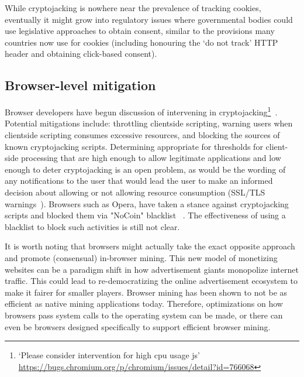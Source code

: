 While cryptojacking is nowhere near the prevalence of tracking cookies, eventually it might grow into regulatory issues where governmental bodies could use legislative approaches to obtain consent, similar to the provisions many countries now use for cookies (including honouring the `do not track' HTTP header and obtaining click-based consent).


\subsection{Browser-level mitigation}

Browser developers have begun discussion of intervening in cryptojacking\footnote{`Please consider intervention for high cpu usage js' \url{https://bugs.chromium.org/p/chromium/issues/detail?id=766068}}~\cite{operanocoin}. Potential mitigations include: throttling clientside scripting, warning users when clientside scripting consumes excessive resources, and blocking the sources of known cryptojacking scripts. Determining appropriate for thresholds for client-side processing that are high enough to allow legitimate applications and low enough to deter cryptojacking is an open problem, as would be the wording of any notifications to the user that would lead the user to make an informed decision about allowing or not allowing resource consumption (\cf SSL/TLS warnings~\cite{SEAAC09,SHB11,Acer:2017:WWR:3133956.3134007}).
Browsers such as Opera, have taken a stance against cryptojacking scripts and blocked them via "NoCoin" blacklist ~\cite{operanocoin}. The effectiveness of using a blacklist to block such activities is still not clear. %

It is worth noting that browsers might actually take the exact opposite approach and promote (consensual) in-browser mining. This new model of monetizing websites can be a paradigm shift in how advertisement giants monopolize internet traffic. This could lead to re-democratizing the online advertisement ecosystem to make it fairer for smaller players. Browser mining has been shown to not be as efficient as native mining applications today. Therefore, optimizations on how browsers pass system calls to the operating system can be made, or there can even be browsers designed specifically to support efficient browser mining. 



